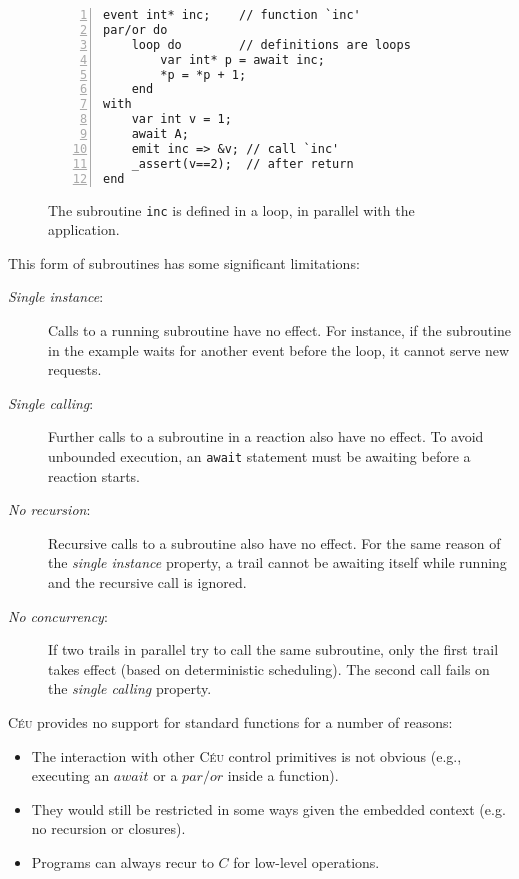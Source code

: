 \documentclass{acm_proc_article-sp}
\newcommand{\CEU}{\textsc{C\'{e}u}\xspace}
\newcommand{\code}[1] {{\small{\texttt{#1}}}}
\newcommand{\1}{\;}
\newcommand{\2}{\;\;}
\newcommand{\3}{\;\;\;}
\newcommand{\5}{\;\;\;\;\;}
\begin{document}
\begin{figure}
\begin{lstlisting}[numbers=left,xleftmargin=2em]
event int* inc;    // function `inc'
par/or do
    loop do        // definitions are loops
        var int* p = await inc;
        *p = *p + 1;
    end
with
    var int v = 1;
    await A;
    emit inc => &v; // call `inc'
    _assert(v==2);  // after return
end
\end{lstlisting}
\caption{ The subroutine \code{inc} is defined in a loop, in parallel with the 
application.
\label{lst.sub}
}
\end{figure}

This form of subroutines has some significant limitations:

\begin{description}
\item[\emph{Single instance}:] Calls to a running subroutine have no effect.
For instance, if the subroutine in the example waits for another event before 
the loop, it cannot serve new requests.
%
\item[\emph{Single calling}:] Further calls to a subroutine in a reaction also 
have no effect.
To avoid unbounded execution, an \code{await} statement must be awaiting before 
a reaction starts.
%
\item[\emph{No recursion}:] Recursive calls to a subroutine also have no 
effect.
For the same reason of the \emph{single instance} property, a trail cannot be 
awaiting itself while running and the recursive call is ignored.
%
\item[\emph{No concurrency}:] If two trails in parallel try to call the same 
subroutine, only the first trail takes effect (based on deterministic 
scheduling).
The second call fails on the \emph{single calling} property.
\end{description}

\vspace{5pt}
\CEU provides no support for standard functions for a number of reasons:
\begin{itemize}
\item The interaction with other \CEU control primitives is not obvious (e.g., 
executing an $await$ or a $par/or$ inside a function).
\item They would still be restricted in some ways given the embedded context 
(e.g.  no recursion or closures).
\item Programs can always recur to $C$ for low-level operations.
\end{itemize}
\end{document}
